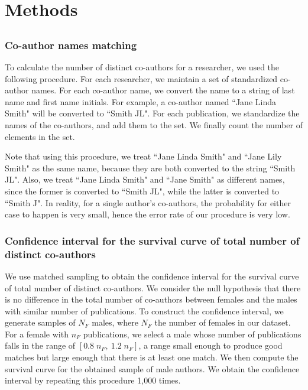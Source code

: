 \chapter{Methods}
\label{ch:methods}

\section{}
\label{sec:methods:collaboration}

\subsection{Co-author names matching}

To calculate the number of distinct co-authors for a researcher, we used the following procedure. For each researcher, we maintain a set of standardized co-author names. For each co-author name, we convert the name to a string of last name and first name initials. For example, a co-author named ``Jane Linda Smith" will be converted to ``Smith JL". For each publication, we standardize the names of the co-authors, and add them to the set. We finally count the number of elements in the set.

Note that using this procedure, we treat ``Jane Linda Smith" and ``Jane Lily Smith" as the same name, because they are both converted to the string ``Smith JL". Also, we treat ``Jane Linda Smith" and ``Jane Smith" as different names, since the former is converted to ``Smith JL", while the latter is converted to ``Smith J". In reality, for a single author's co-authors, the probability for either case to happen is very small, hence the error rate of our procedure is very low.


\subsection{Confidence interval for the survival curve of total number of distinct co-authors}

We use matched sampling to obtain the confidence interval for the survival curve of total number of distinct co-authors. We consider the null hypothesis that there is no difference in the total number of co-authors between females and the males with similar number of publications. To construct the confidence interval, we generate samples of $N_F$ males, where $N_F$ the number of females in our dataset. For a female with $n_F$ publications, we select a male whose number of publications falls in the range of $[0.8\;n_F,~1.2\;n_F]$, a range small enough to produce good matches but large enough that there is at least one match. We then compute the survival curve for the obtained sample of male authors. We obtain the confidence interval by repeating this procedure 1,000 times.

